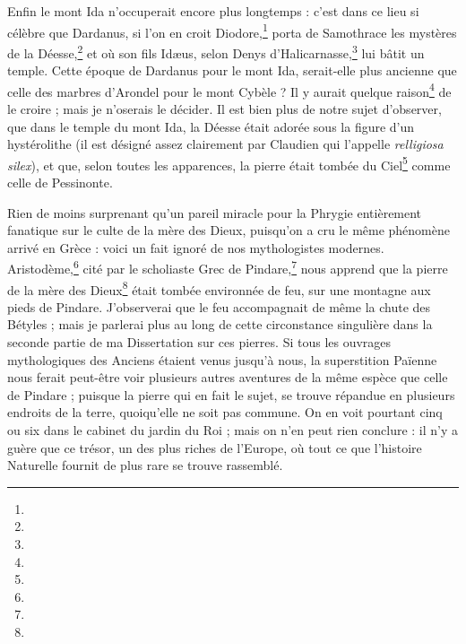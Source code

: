 \documentclass[a4paper, 11pt, oneside, polutonikogreek, french]{article}
\begin{document}
Enfin le mont Ida n'occuperait encore plus longtemps : c'est dans ce lieu si célèbre que Dardanus, si l'on en croit Diodore,\footnote{} porta de Samothrace les mystères de la Déesse,\footnote{} et où son fils Idæus, selon Denys d'Halicarnasse,\footnote{} lui bâtit un temple. Cette époque de Dardanus pour le mont Ida, serait-elle plus ancienne que celle des marbres d'Arondel pour le mont Cybèle ? Il y aurait quelque raison\footnote{} de le croire ; mais je n'oserais le décider. Il est bien plus de notre sujet d'observer, que dans le temple du mont Ida, la Déesse était adorée sous la figure d'un hystérolithe (il est désigné assez clairement par Claudien qui l'appelle \emph{relligiosa silex}), et que, selon toutes les apparences, la pierre était tombée du Ciel\footnote{} comme celle de Pessinonte.

Rien de moins surprenant qu'un pareil miracle pour la Phrygie entièrement fanatique sur le culte de la mère des Dieux, puisqu'on a cru le même phénomène arrivé en Grèce : voici un fait ignoré de nos mythologistes modernes. Aristodème,\footnote{} cité par le scholiaste Grec de Pindare,\footnote{} nous apprend que la pierre de la mère des Dieux\footnote{} était tombée environnée de feu, sur une montagne aux pieds de Pindare. J'observerai que le feu accompagnait de même la chute des Bétyles ; mais je parlerai plus au long de cette circonstance singulière dans la seconde partie de ma Dissertation sur ces pierres. Si tous les ouvrages mythologiques des Anciens étaient venus jusqu'à nous, la superstition Païenne nous ferait peut-être voir plusieurs autres aventures de la même espèce que celle de Pindare ; puisque la pierre qui en fait le sujet, se trouve répandue en plusieurs endroits de la terre, quoiqu'elle ne soit pas commune. On en voit pourtant cinq ou six dans le cabinet du jardin du Roi ; mais on n'en peut rien conclure : il n'y a guère que ce trésor, un des plus riches de l'Europe, où tout ce que l'histoire Naturelle fournit de plus rare se trouve rassemblé.
\end{document}
